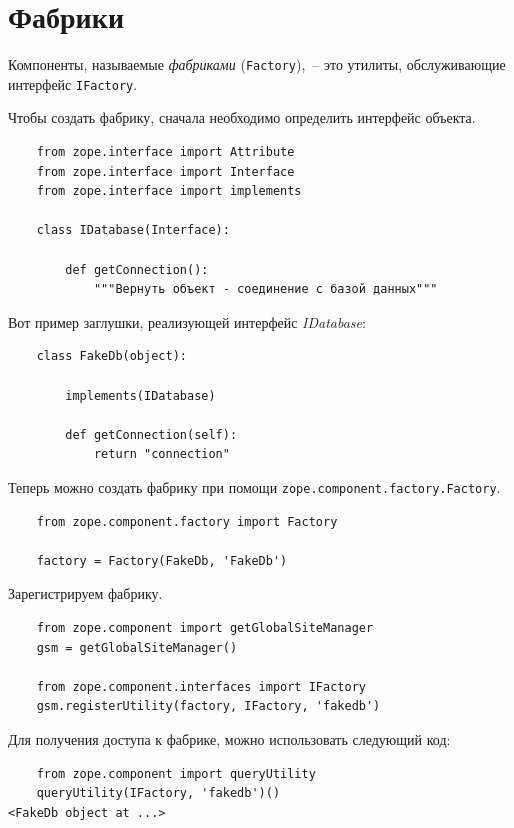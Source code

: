 \documentclass[a4paper,openany,twoside,final]{book}
\providecommand*{\DUroletitlereference}[1]{\textsl{#1}}
\begin{document}
\section{Фабрики%
  \label{id43}%
}

Компоненты, называемые \DUroletitlereference{фабриками} (\texttt{Factory}),~-- это утилиты, обслуживающие интерфейс \texttt{IFactory}.

Чтобы создать фабрику, сначала необходимо определить интерфейс объекта.

\begin{verbatim}
    from zope.interface import Attribute
    from zope.interface import Interface
    from zope.interface import implements

    class IDatabase(Interface):

        def getConnection():
            """Вернуть объект - соединение с базой данных"""
\end{verbatim}

Вот пример заглушки, реализующей интерфейс \DUroletitlereference{IDatabase}:

\begin{verbatim}
    class FakeDb(object):

        implements(IDatabase)

        def getConnection(self):
            return "connection"
\end{verbatim}

Теперь можно создать фабрику при помощи \texttt{zope.component.factory.Factory}.

\begin{verbatim}
    from zope.component.factory import Factory

    factory = Factory(FakeDb, 'FakeDb')
\end{verbatim}

Зарегистрируем фабрику.

\begin{verbatim}
    from zope.component import getGlobalSiteManager
    gsm = getGlobalSiteManager()

    from zope.component.interfaces import IFactory
    gsm.registerUtility(factory, IFactory, 'fakedb')
\end{verbatim}

Для получения доступа к фабрике, можно использовать следующий код:

\begin{verbatim}
    from zope.component import queryUtility
    queryUtility(IFactory, 'fakedb')()
<FakeDb object at ...>
\end{verbatim}
\end{document}
